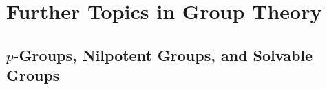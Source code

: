 \documentclass[../main]{subfiles}
\begin{document}
\section{Further Topics in Group Theory}


\subsection{$p$-Groups, Nilpotent Groups, and Solvable Groups}
\end{document}

